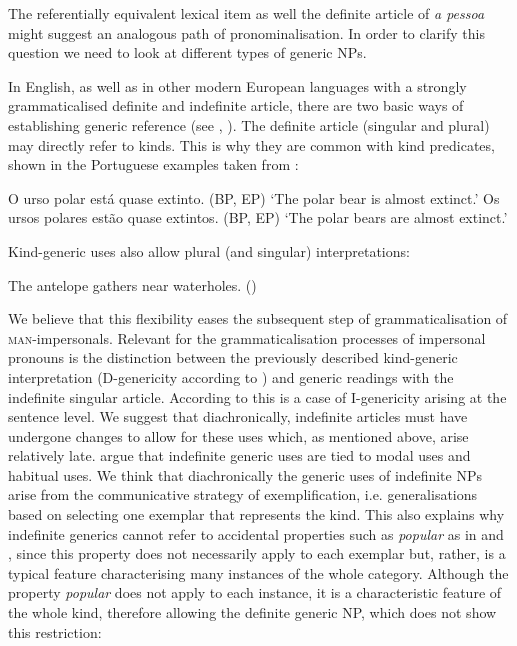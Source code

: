 \documentclass[output=paper]{langscibook}
\begin{document}
The referentially equivalent lexical item as well the definite article of \textit{a pessoa} might suggest an analogous path of pronominalisation. In order to clarify this question we need to look at different types of generic NPs. 



In English, as well as in other modern European languages with a strongly grammaticalised definite and indefinite article, there are two basic ways of establishing generic reference (see \citealt{KrifkaGerstner-Link1993}, \citealt{Krifka1995}). The definite article (singular and plural) may directly refer to kinds. This is why they are common with kind predicates, shown in the Portuguese examples taken from \citet{BarraFerreiraNunesCorreia2016}:

\ea\label{ex:amaral:5}O urso polar está quase extinto. {(BP, EP)}
\glt ‘The polar bear is almost extinct.’
\ex\label{ex:amaral:6}Os ursos polares estão quase extintos. {(BP, EP)}
\glt ‘The polar bears are almost extinct.’
\z 

Kind-generic uses also allow plural (and singular) interpretations: 

\ea\label{ex:amaral:7}The antelope gathers near waterholes. (\citealt{KrifkaGerstner-Link1993})\z 

\begin{sloppypar}
We believe that this flexibility eases the subsequent step of grammaticalisation of {\textsc{man}}{{}-impersonals. Relevant for the grammaticalisation processes of impersonal pronouns is the distinction between the previously described kind-generic interpretation (D-genericity according to \citealt{KrifkaGerstner-Link1993}) and generic readings with the indefinite singular article. According to \citet{KrifkaGerstner-Link1993} this is a case of I-genericity arising at the sentence level. We suggest that diachronically, indefinite articles must have undergone changes to allow for these uses which, as mentioned above, arise relatively late. \citet{KrifkaGerstner-Link1993} argue that indefinite generic uses are tied to modal uses and habitual uses. We think that diachronically the generic uses of indefinite NPs arise from the communicative strategy of exemplification, i.e. generalisations based on selecting one exemplar that represents the kind. This also explains why indefinite generics cannot refer to accidental properties such as} {\textit{popular} }{as in  and , since this property does not necessarily apply to each exemplar but, rather, is a typical feature characterising many instances of the whole category. Although the property} \textit{popular} does not apply to each instance, it is a characteristic feature of the whole kind, therefore allowing the definite generic NP, which does not show this restriction:
\end{sloppypar}
\end{document}
